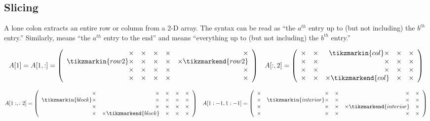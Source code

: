 \subsection*{Slicing}

A lone colon extracts an entire row or column from a 2-D array.
The syntax \li{[a:b]} can be read as ``the $a^{th}$ entry up to (but not including) the $b^{th}$ entry.''
Similarly, \li{[a:]} means ``the $a^{th}$ entry to the end'' and \li{[:b]} means ``everything up to (but not including) the $b^{th}$ entry.''

\begin{align*}
A[1] = A[1,:] = \left(\begin{array}{rrrrr}
\times & \times & \times & \times & \times\\
\tikzmarkin{row2}\times & \times & \times & \times & \times\tikzmarkend{row2}\\
\times & \times & \times & \times & \times\\
\times & \times & \times & \times & \times\\
\end{array}\right)
&&
A[:,2] = \left(\begin{array}{rrrrr}
\times & \times & \tikzmarkin{col}\times & \times & \times\\
\times & \times & \times & \times & \times\\
\times & \times & \times & \times & \times\\
\times & \times & \times\tikzmarkend{col} & \times & \times
\end{array}\right)
\end{align*}

\begin{align*}
A[1:,:2] = \left(\begin{array}{rrrrr}
\times & \times & \times & \times & \times\\
\tikzmarkin{block}\times & \times & \times & \times & \times\\
\times & \times & \times & \times & \times\\
\times & \times\tikzmarkend{block} & \times & \times & \times
\end{array}\right)
&&
A[1:-1,1:-1] = \left(\begin{array}{rrrrr}
\times & \times & \times & \times & \times\\
\times & \tikzmarkin{interior} \times & \times & \times & \times\\
\times & \times & \times & \times \tikzmarkend{interior} & \times\\
\times & \times & \times & \times & \times\end{array}\right)
\end{align*}

